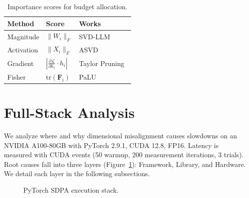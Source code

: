 \documentclass[sigplan,10pt]{acmart}
\begin{document}
\begin{table}[t]
\centering
\caption{Importance scores for budget allocation.}
\label{tab:importance_scores}
\small
\setlength{\tabcolsep}{2.5pt}
\begin{tabular}{@{}lll@{}}
\toprule
\textbf{Method} & \textbf{Score} & \textbf{Works} \\
\midrule
Magnitude & $\|W_i\|_F$ & SVD-LLM~\citep{svdllm2024} \\
Activation & $\|X_i\|_F$ & ASVD~\citep{asvd} \\
Gradient & $\left|\frac{\partial \mathcal{L}}{\partial h_i} \cdot h_i\right|$ & Taylor Pruning~\citep{taylor_pruning} \\
Fisher & $\mathrm{tr}(\mathbf{F}_i)$ & PaLU~\citep{palu} \\
\bottomrule
\end{tabular}
\end{table}


\section{Full-Stack Analysis}
\label{sec:analysis}
We analyze where and why dimensional misalignment causes slowdowns on an NVIDIA A100-80GB with PyTorch 2.9.1, CUDA 12.8, FP16.
Latency is measured with CUDA events (50 warmup, 200 measurement iterations, 3 trials).
Root causes fall into three layers (Figure~\ref{fig:fullstack_overview}): Framework, Library, and Hardware. We detail each layer in the following subsections.
\begin{figure}[t]
  \vspace{0.2cm}
  \centering
  \caption{PyTorch SDPA execution stack.}
  \label{fig:fullstack_overview}
  \end{figure}
\end{document}

